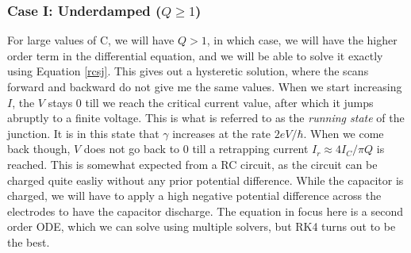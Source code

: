 \documentclass{thesis}
\begin{document}
\subsubsection{Case I: Underdamped ($Q \ge 1$)}
For large values of C, we will have $Q>1$, in which case, we will have the higher order term in the differential equation, and we will be able to solve it exactly using Equation \ref{rcsj}. This gives out a hysteretic solution, where the scans forward and backward do not give me the same values. When we start increasing $I$, the $V$ stays $0$ till we reach the critical current value, after which it jumps abruptly to a finite voltage. This is what is referred to as the \textit{running state} of the junction. It is in this state that $\gamma$ increases at the rate $2eV/\hbar$. When we come back though, $V$ does not go back to $0$ till a retrapping current $I_r \approx 4I_C/\pi Q$ is reached. This is somewhat expected from a RC circuit, as the circuit can be charged quite easliy without any prior potential difference. While the capacitor is charged, we will have to apply a high negative potential difference across the electrodes to have the capacitor discharge. The equation in focus here is a second order ODE, which we can solve using multiple solvers, but RK4 turns out to be the best.
\end{document}
